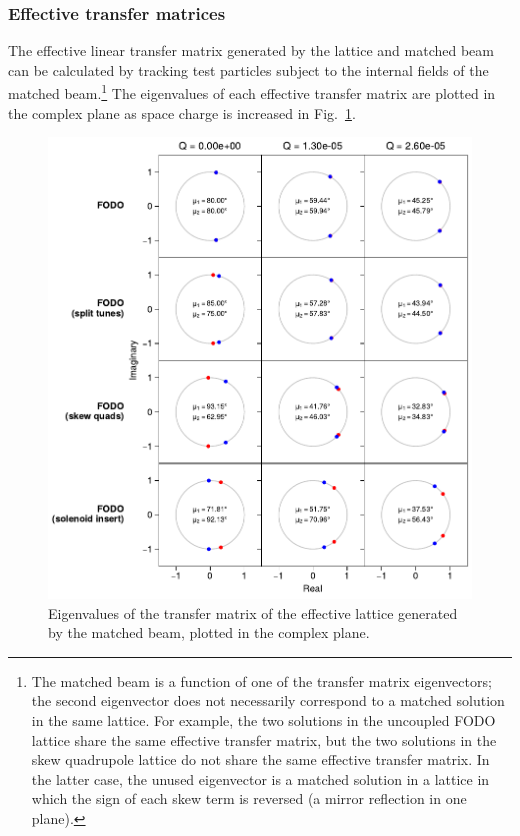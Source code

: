 \subsubsection{Effective transfer matrices}

The effective linear transfer matrix generated by the lattice and matched beam can be calculated by tracking test particles subject to the internal fields of the matched beam.\footnote{The matched beam is a function of one of the transfer matrix eigenvectors; the second eigenvector does not necessarily correspond to a matched solution in the same lattice. For example, the two solutions in the uncoupled FODO lattice share the same effective transfer matrix, but the two solutions in the skew quadrupole lattice do not share the same effective transfer matrix. In the latter case, the unused eigenvector is a matched solution in a lattice in which the sign of each skew term is reversed (a mirror reflection in one plane).} The eigenvalues of each effective transfer matrix are plotted in the complex plane as space charge is increased in Fig.~\ref{fig:effective_transfer_matrix_eigvals}.
%
\begin{figure}[!p]
    \centering
    \includegraphics[width=\textwidth]{Images/chapter2/eigvals.pdf}
    \caption{Eigenvalues of the transfer matrix of the effective lattice generated by the matched beam, plotted in the complex plane.}
    \label{fig:effective_transfer_matrix_eigvals}
\end{figure}
